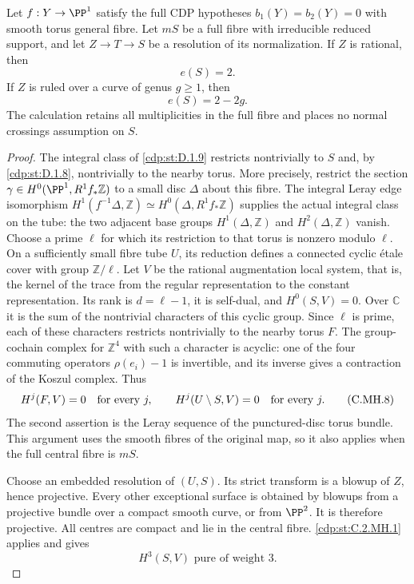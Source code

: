 
\begin{proposition}\label{cdp:st:C.2.MH.2}
Let $f:Y\to\PP^1$ satisfy the full CDP hypotheses
$b_1(Y)=b_2(Y)=0$ with smooth torus general fibre.
Let $mS$ be a full fibre with irreducible reduced support,
and let $Z\to T\to S$ be a resolution of its
normalization. If $Z$ is rational, then
\[
                              e(S)=2.
 \tag{C.MH.6}\label{cdp:eq:C.MH.6}
\]
If $Z$ is ruled over a curve of genus $g\ge1$, then
\[
                              e(S)=2-2g.
 \tag{C.MH.7}\label{cdp:eq:C.MH.7}
\]
The calculation retains all multiplicities in the full
fibre and places no normal crossings assumption on $S$.
\end{proposition}
\begin{proof}
The integral class of \ref{cdp:st:D.1.9} restricts nontrivially to
$S$ and, by \ref{cdp:st:D.1.8}, nontrivially to the nearby torus.
More precisely, restrict the section
$\gamma\in H^0(\PP^1,R^1f_*\mathbb Z)$ to a small
disc $\Delta$ about this fibre. The integral Leray edge
isomorphism
$H^1(f^{-1}\Delta,\mathbb Z)
 \simeq H^0(\Delta,R^1f_*\mathbb Z)$ supplies the
actual integral class on the tube: the two adjacent
base groups $H^1(\Delta,\mathbb Z)$ and
$H^2(\Delta,\mathbb Z)$ vanish.
Choose a prime $\ell$ for which its restriction to that
torus is nonzero modulo $\ell$. On a sufficiently small
fibre tube $U$, its reduction defines a connected cyclic
\'{e}tale cover with group $\mathbb Z/\ell$. Let $V$ be
the rational augmentation local system, that is, the
kernel of the trace from the regular representation
to the constant representation. Its rank is
$d=\ell-1$, it is self-dual, and $H^0(S,V)=0$.
Over $\mathbb C$ it is the sum of the nontrivial
characters of this cyclic group. Since $\ell$ is prime,
each of these characters restricts nontrivially to
the nearby torus $F$. The group-cochain complex for
$\mathbb Z^4$ with such a character is acyclic: one of
the four commuting operators $\rho(e_i)-1$ is
invertible, and its inverse gives a contraction of the
Koszul complex. Thus
\[
 H^j(F,V)=0\quad\hbox{for every }j,
 \qquad H^j(U\setminus S,V)=0\quad\hbox{for every }j.
 \tag{C.MH.8}\label{cdp:eq:C.MH.8}
\]
The second assertion is the Leray sequence of the
punctured-disc torus bundle. This argument uses the
smooth fibres of the original map, so it also applies
when the full central fibre is $mS$.

Choose an embedded resolution of $(U,S)$. Its strict
transform is a blowup of $Z$, hence projective. Every
other exceptional surface is obtained by blowups from
a projective bundle over a compact smooth curve, or
from $\PP^2$. It is therefore projective. All centres
are compact and lie in the central fibre. \ref{cdp:st:C.2.MH.1}
applies and gives
\[
                         H^3(S,V)\text{ pure of weight }3.
 \tag{C.MH.9}\label{cdp:eq:C.MH.9}
\]


\end{proof}
